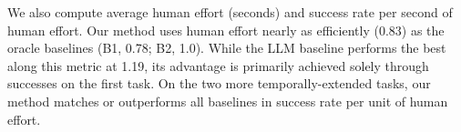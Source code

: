 We also compute average human effort (seconds) and success rate per second of human effort. Our method uses human effort nearly as efficiently (0.83) as the oracle baselines (B1, 0.78; B2, 1.0). While the LLM baseline performs the best along this metric at 1.19, its advantage is primarily achieved solely through successes on the first task. On the two more temporally-extended tasks, our method matches or outperforms all baselines in success rate per unit of human effort.

\begin{table}[ht!] %
\caption{Additional Real-world Baselines and Human Effort Efficiency}
\label{tab:more-rw-baselines-effort-efficiency}
\centering
{}
\end{table}
